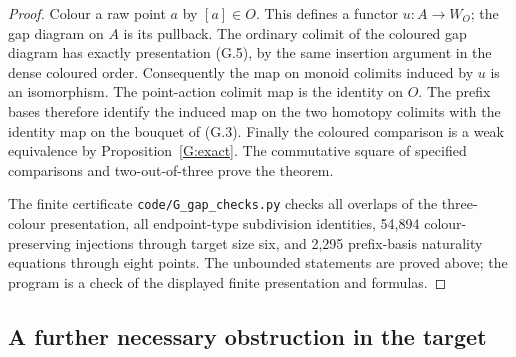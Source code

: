 \begin{proof}
Colour a raw point $a$ by $[a]\in O$.  This defines a functor
$u:A\to W_O$; the gap diagram on $A$ is its pullback.  The
ordinary colimit of the coloured gap diagram has exactly
presentation (G.5), by the same insertion argument in the dense
coloured order.  Consequently the map on monoid colimits induced
by $u$ is an isomorphism.  The point-action colimit map is the
identity on $O$.  The prefix bases therefore identify the induced
map on the two homotopy colimits with the identity map on the
bouquet of (G.3).  Finally the coloured comparison is a weak
equivalence by Proposition~\ref{G:exact}.  The commutative square
of specified comparisons and two-out-of-three prove the theorem.

The finite certificate \texttt{code/G\_gap\_checks.py} checks
all overlaps of the three-colour presentation, all endpoint-type
subdivision identities, 54,894 colour-preserving injections
through target size six, and 2,295 prefix-basis naturality
equations through eight points.  The unbounded statements are
proved above; the program is a check of the displayed finite
presentation and formulas.
\end{proof}

\subsection{A further necessary obstruction in the target}

